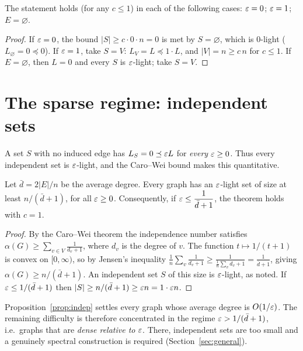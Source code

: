 \begin{proposition}\label{prop:boundary}
The statement holds (for any $c\le 1$) in each of the following cases:
$\varepsilon=0$; $\varepsilon=1$; $E=\varnothing$.
\end{proposition}
\begin{proof}
If $\varepsilon=0$, the bound $|S|\ge c\cdot 0\cdot n=0$ is met by $S=\varnothing$, which is
$0$-light ($L_\varnothing=0\preceq 0$). If $\varepsilon=1$, take $S=V$: $L_V=L\preceq 1\cdot L$, and
$|V|=n\ge c\,n$ for $c\le 1$. If $E=\varnothing$, then $L=0$ and every $S$ is $\varepsilon$-light;
take $S=V$.
\end{proof}

\section{The sparse regime: independent sets}\label{sec:sparse}

A set $S$ with no induced edge has $L_S=0\preceq\varepsilon L$ for \emph{every} $\varepsilon\ge 0$. Thus every
independent set is $\varepsilon$-light, and the Caro--Wei bound makes this quantitative.

\begin{proposition}\label{prop:indep}
Let $\bar d=2|E|/n$ be the average degree. Every graph has an $\varepsilon$-light set of size at least
$n/(\bar d+1)$, for all $\varepsilon\ge 0$. Consequently, if $\varepsilon\le \dfrac{1}{\bar d+1}$, the
theorem holds with $c=1$.
\end{proposition}
\begin{proof}
By the Caro--Wei theorem the independence number satisfies
$\alpha(G)\ge\sum_{v\in V}\frac{1}{d_v+1}$, where $d_v$ is the degree of $v$. The function
$t\mapsto 1/(t+1)$ is convex on $[0,\infty)$, so by Jensen's inequality
$\frac1n\sum_v\frac{1}{d_v+1}\ge\frac{1}{\frac1n\sum_vd_v+1}=\frac{1}{\bar d+1}$, giving
$\alpha(G)\ge n/(\bar d+1)$. An independent set $S$ of this size is $\varepsilon$-light, as noted.
If $\varepsilon\le 1/(\bar d+1)$ then $|S|\ge n/(\bar d+1)\ge\varepsilon n=1\cdot\varepsilon n$.
\end{proof}

\begin{remark}
Proposition~\ref{prop:indep} settles every graph whose average degree is $O(1/\varepsilon)$. The
remaining difficulty is therefore concentrated in the regime $\varepsilon>1/(\bar d+1)$, i.e.\ graphs
that are \emph{dense relative to} $\varepsilon$. There, independent sets are too small and a genuinely
spectral construction is required (Section~\ref{sec:general}).
\end{remark}


